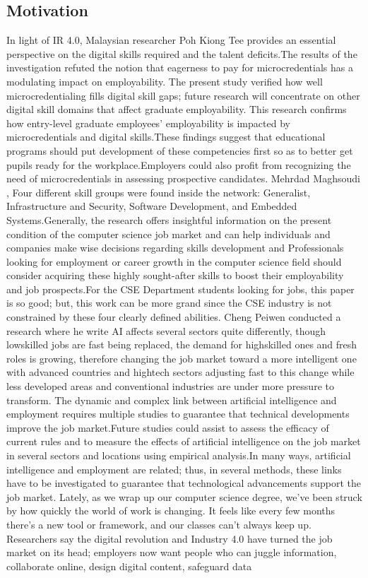 \documentclass[final,5p,times,twocolumn]{elsarticle}
\begin{document}
\subsection{Motivation}
In light of IR 4.0, Malaysian researcher Poh Kiong Tee \cite{M1_tee2024bridging} provides an essential perspective on the digital skills required and the talent deficits.The results of the investigation refuted the notion that eagerness to pay for microcredentials has a modulating impact on employability. The present study verified how well microcredentialing fills digital skill gaps; future research will concentrate on other digital skill domains that affect graduate employability. This research confirms how entry-level graduate employees' employability is impacted by microcredentials and digital skills.These findings suggest that educational programs should put development of these competencies first so as to better get pupils ready for the workplace.Employers could also profit from recognizing the need of microcredentials in assessing prospective candidates. Mehrdad Maghsoudi \cite{M2_maghsoudi2024uncovering}, Four different skill groups were found inside the network: Generalist, Infrastructure and Security, Software Development, and Embedded Systems.Generally, the research offers insightful information on the present condition of the computer science job market and can help individuals and companies make wise decisions regarding skills development and Professionals looking for employment or career growth in the computer science field should consider acquiring these highly sought-after skills to boost their employability and job prospects.For the CSE Department students looking for jobs, this paper is so good; but, this work can be more grand since the CSE industry is not constrained by these four clearly defined abilities. Cheng Peiwen \cite{M3_peiwen2025impact} conducted a research where he write AI affects several sectors quite differently, though lowskilled jobs are fast being replaced, the demand for highskilled ones and fresh roles is growing, therefore changing the job market toward a more intelligent one with advanced countries and hightech sectors adjusting fast to this change while less developed areas and conventional industries are under more pressure to transform. The dynamic and complex link between artificial intelligence and employment requires multiple studies to guarantee that technical developments improve the job market.Future studies could assist to assess the efficacy of current rules and to measure the effects of artificial intelligence on the job market in several sectors and locations using empirical analysis.In many ways, artificial intelligence and employment are related; thus, in several methods, these links have to be investigated to guarantee that technological advancements support the job market. Lately, as we wrap up our computer science degree, we've been struck by how quickly the world of work is changing. It feels like every few months there's a new tool or framework, and our classes can't always keep up. Researchers say the digital revolution and Industry 4.0 have turned the job market on its head; employers now want people who can juggle information, collaborate online, design digital content, safeguard data 
\end{document}
